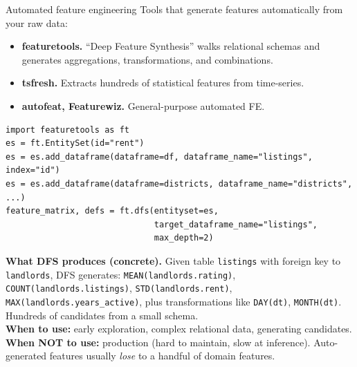 \documentclass[aspectratio=169]{beamer}
\begin{document}
\begin{frame}[fragile]{Automated feature engineering}
  Tools that generate features automatically from your raw data:
  \vfill
  \begin{itemize}
    \item \textbf{featuretools.} ``Deep Feature Synthesis'' walks relational schemas and generates aggregations, transformations, and combinations.
    \item \textbf{tsfresh.} Extracts hundreds of statistical features from time-series.
    \item \textbf{autofeat, Featurewiz.} General-purpose automated FE.
  \end{itemize}
  \vfill
{\lstset{basicstyle=\ttfamily\scriptsize}
\begin{lstlisting}
import featuretools as ft
es = ft.EntitySet(id="rent")
es = es.add_dataframe(dataframe=df, dataframe_name="listings", index="id")
es = es.add_dataframe(dataframe=districts, dataframe_name="districts", ...)
feature_matrix, defs = ft.dfs(entityset=es,
                              target_dataframe_name="listings",
                              max_depth=2)
\end{lstlisting}}
  \vfill
  \footnotesize \textbf{What DFS produces (concrete).} Given table \texttt{listings} with foreign key to \texttt{landlords}, DFS generates: \texttt{MEAN(landlords.rating)}, \texttt{COUNT(landlords.listings)}, \texttt{STD(landlords.rent)}, \texttt{MAX(landlords.years\_active)}, plus transformations like \texttt{DAY(dt)}, \texttt{MONTH(dt)}. Hundreds of candidates from a small schema.\\[2pt]
  \textbf{When to use:} early exploration, complex relational data, generating candidates.\\
  \textbf{When NOT to use:} production (hard to maintain, slow at inference). Auto-generated features usually \emph{lose} to a handful of domain features.
\end{frame}
\end{document}
